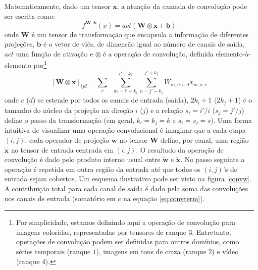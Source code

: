 Matematicamente, dado um tensor $\mathbf{x}$, a atuação da camada de convolução pode ser escrita como:
\begin{equation}
f^{\mathbf{W}, \mathbf{b}}(x) = act(\mathbf{W} \otimes \mathbf{x} + \mathbf{b})
\end{equation}
onde $\mathbf{W}$ é um tensor de transformação que encapsula a informação de diferentes projeções, $\mathbf{b}$ é o vetor de viés, de dimensão igual ao número de canais de saída, $act$ uma função de ativação e $\otimes$ é a operação de convolução, definida elemento-à-elemento por\footnote{Por simplicidade, estamos definindo aqui a operação de convolução para imagens coloridas, representadas por tensores de ranque $3$. Entretanto, operações de convolução podem ser definidas para outros domínios, como séries temporais (ranque $1$), imagens em tons de cinza (ranque $2$) e vídeo (ranque $4$).}
\begin{equation}\label{eq:convterm}
[\mathbf{W} \otimes \mathbf{x}]_{ijd} = \sum_{c} \;\; \sum_{m=i'-k_i}^{i'+ k_i} \sum_{n=j'-k_j}^{j'+k_j} W_{m, n, c, d} x_{m, n, c}
\end{equation}
onde $c$ ($d$) se estende por todos os canais de entrada (saída), $2k_i+1$ ($2k_j+1$) é o tamanho do núcleo da projeção na direção $i$ ($j$) e a relação $s_i = i'/i$ ($s_j = j'/j$) define o passo da transformação (em geral, $k_i = k_j = k$ e $s_i = s_j = s$). Uma forma intuitiva de visualizar uma operação convolucional é imaginar que a cada etapa $(i,j)$, cada operador de projeção $\tilde{\mathbf{w}}$ no tensor $\mathbf{W}$ define, por canal, uma região $\tilde{\mathbf{x}}$ no tensor de entrada centrada em $(i,j)$. O resultado da operação de convolução é dado pelo produto interno usual entre $\tilde{\mathbf{w}}$ e $\tilde{\mathbf{x}}$. No passo seguinte a operação é repetida em outra região da entrada até que todos os $(i,j)$'s de entrada sejam cobertos. Um esquema ilustrativo pode ser visto na figura \ref{convw}. A contribuição total para cada canal de saída é dado pela soma das convoluções nos canais de entrada (somatório em $c$ na equação \ref{eq:convterm}). 


